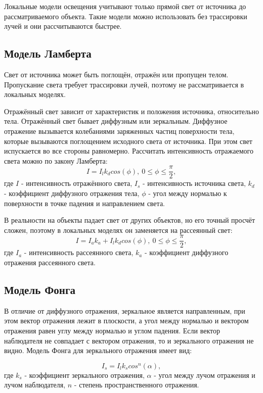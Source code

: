 Локальные модели освещения учитывают только прямой свет от источника до рассматриваемого объекта. Такие модели можно использовать без трассировки лучей и они рассчитываются быстрее.

\subsection{Модель Ламберта}
Свет от источника может быть поглощён, отражён или пропущен телом. Пропускание света требует трассировки лучей, поэтому не рассматривается в локальных моделях.

Отражённый свет зависит от характеристик и положения источника, относительно тела. Отражённый свет бывает диффузным или зеркальным. Диффузное отражение вызывается колебаниями заряженных частиц поверхности тела, которые вызываются поглощением исходного света от источника. При этом свет испускается во все стороны равномерно. Рассчитать интенсивность отражаемого света можно по закону Ламберта:
\begin{equation}
	\label{eq:lambert1}
	I = I_{l}k_dcos(\phi),\ 0\leq\phi\leq\frac{\pi}{2},
\end{equation}
где $I$ - интенсивность отражённого света, $I_s$ - интенсивность источника света, $k_d$ - коэффициент диффузного отражения тела, $\phi$ - угол между нормалью к поверхности в точке падения и направлением света.

В реальности на объекты падает свет от других объектов, но его точный просчёт сложен, поэтому в локальных моделях он заменяется на рассеянный свет:
\begin{equation}
	\label{eq:lambert2}
	I = I_ak_a + I_{l}k_dcos(\phi),\ 0\leq\phi\leq\frac{\pi}{2},
\end{equation}
где $I_a$ - интенсивность рассеянного света, $k_a$ - коэффициент диффузного отражения рассеянного света. 

\subsection{Модель Фонга}
В отличие от диффузного отражения, зеркальное является направленным, при этом вектор отражения лежит в плоскости, а угол между нормалью и вектором отражения равен углу между нормалью и углом падения. Если вектор наблюдателя не совпадает с вектором отражения, то и зеркального отражения не видно. Модель Фонга для зеркального отражения имеет вид:

\begin{equation}
	\label{eq:fong-reflection}
	I_s = I_{l}k_scos^n(\alpha),
\end{equation}
где $k_s$ - коэффициент зеркального отражения, $\alpha$ - угол между лучом отражения и лучом наблюдателя, $n$ - степень пространственного отражения.

